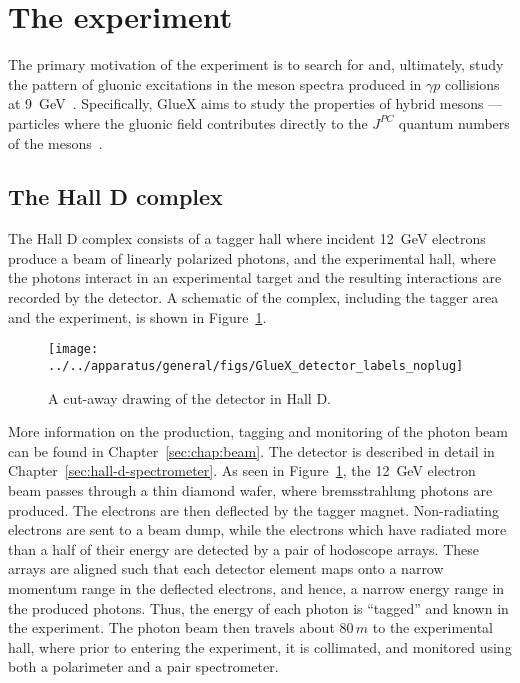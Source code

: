 

\section[The \gx{} experiment (TCR)]{The \gx{} experiment \label{sec:gluexexperiment} }

The primary motivation of the \gx{} experiment is to search for and, ultimately, study the pattern of gluonic excitations in the meson spectra produced 
in $\gamma p$ collisions at 9~GeV~\cite{gluex-ref}. Specifically, GlueX aims to study the properties of hybrid mesons --- particles where the gluonic field 
contributes directly to the $J^{PC}$ quantum numbers of the mesons~\cite{meyer:2015eta}. 

\subsection[The Hall D complex]{The Hall D complex \label{sec:gluexexperiment:complex}}
The Hall D complex consists of a tagger hall where incident 12~GeV electrons produce
a beam of linearly polarized photons, and the experimental hall, where the photons interact
in an experimental target and the resulting interactions are recorded by the \GX{} detector.
A schematic of the complex, including the tagger area and the \GX{} experiment, is shown 
in Figure~\ref{fig:gluex_schematic}.
\begin{figure}[h!]\centering
\texttt{[image: ../../apparatus/general/figs/GlueX\_detector\_labels\_noplug]}
\caption[]{\label{fig:gluex_schematic}A cut-away drawing of the \GX{} detector in Hall D.}
\end{figure}
More information on the production, tagging and monitoring of the photon beam can be found in
Chapter~\ref{sec:chap:beam}. The \GX{} detector is described in detail in 
Chapter~\ref{sec:hall-d-spectrometer}.
\label{sec:intro:detector}
As seen in Figure~\ref{fig:gluex_schematic}, the 12~GeV electron beam passes through a 
thin diamond wafer, where bremsstrahlung photons are produced. The electrons are then deflected
by the tagger magnet. Non-radiating electrons are sent to a beam dump, while the electrons which
have radiated more than a half of their energy
are detected by a pair of hodoscope arrays. These arrays are aligned such that each detector element
maps onto a narrow momentum range in the deflected electrons, and hence, a narrow energy range
in the produced photons. Thus, the energy of each photon is ``tagged'' and known in  the experiment.
The photon beam then travels about $80\, m$ to the experimental hall, where prior to entering the
experiment, it is collimated, and monitored using both a polarimeter and a pair spectrometer.


